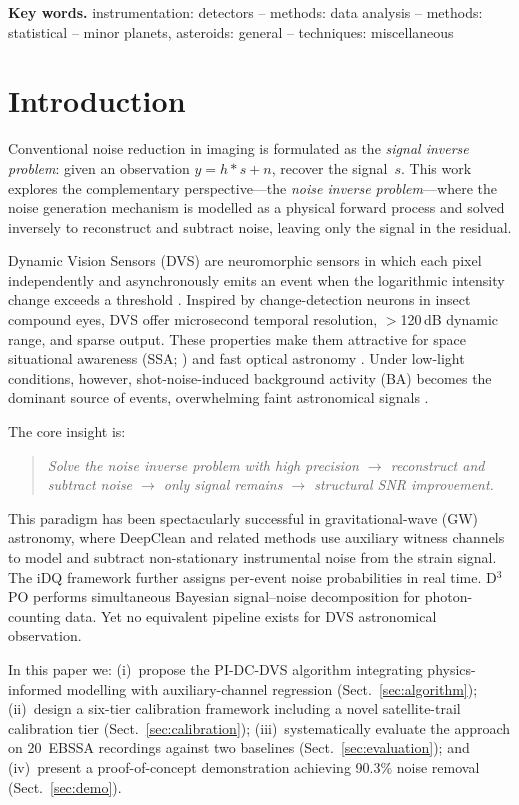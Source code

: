 \documentclass[twocolumn]{article}
\begin{document}
\noindent\textbf{Key words.}
instrumentation: detectors -- methods: data analysis -- methods: statistical -- minor planets, asteroids: general -- techniques: miscellaneous

\section{Introduction}
\label{sec:intro}

Conventional noise reduction in imaging is formulated as the \emph{signal inverse problem}: given an observation $y = h * s + n$, recover the signal~$s$.
This work explores the complementary perspective---the \emph{noise inverse problem}---where the noise generation mechanism is modelled as a physical forward process and solved inversely to reconstruct and subtract noise, leaving only the signal in the residual.

Dynamic Vision Sensors (DVS) are neuromorphic sensors in which each pixel independently and asynchronously emits an event when the logarithmic intensity change exceeds a threshold \citep{A1,A4}.
Inspired by change-detection neurons in insect compound eyes, DVS offer microsecond temporal resolution, $>$120\,dB dynamic range, and sparse output.
These properties make them attractive for space situational awareness (SSA; \citealt{C1,C3,C4}) and fast optical astronomy \citep{C5}.
Under low-light conditions, however, shot-noise-induced background activity (BA) becomes the dominant source of events, overwhelming faint astronomical signals \citep{A1,A2}.

The core insight is:
\begin{quote}
\emph{Solve the noise inverse problem with high precision $\rightarrow$ reconstruct and subtract noise $\rightarrow$ only signal remains $\rightarrow$ structural SNR improvement.}
\end{quote}

This paradigm has been spectacularly successful in gravitational-wave (GW) astronomy, where DeepClean \citep{D1} and related methods \citep{D2,D3,D4} use auxiliary witness channels to model and subtract non-stationary instrumental noise from the strain signal.
The iDQ framework \citep{D6} further assigns per-event noise probabilities in real time.
D$^3$PO \citep{D7} performs simultaneous Bayesian signal--noise decomposition for photon-counting data.
Yet no equivalent pipeline exists for DVS astronomical observation.

In this paper we: (i)~propose the PI-DC-DVS algorithm integrating physics-informed modelling with auxiliary-channel regression (Sect.~\ref{sec:algorithm}); (ii)~design a six-tier calibration framework including a novel satellite-trail calibration tier (Sect.~\ref{sec:calibration}); (iii)~systematically evaluate the approach on 20~EBSSA recordings against two baselines (Sect.~\ref{sec:evaluation}); and (iv)~present a proof-of-concept demonstration achieving 90.3\% noise removal (Sect.~\ref{sec:demo}).
\end{document}
